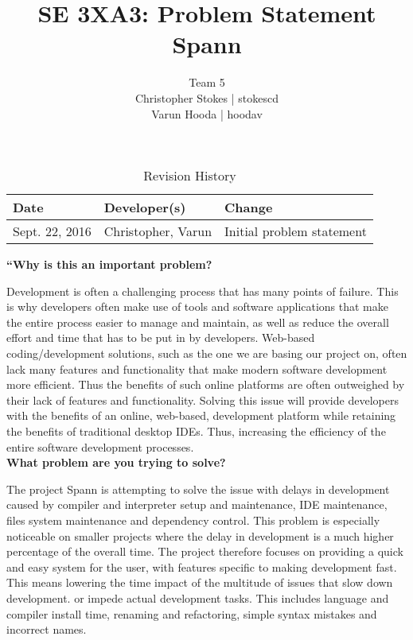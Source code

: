 \documentclass{article}
\title{SE 3XA3: Problem Statement\\Spann}
\author{Team 5
		\\ Christopher Stokes | stokescd
		\\ Varun Hooda | hoodav
}
\date{}
\begin{document}
\begin{table}[hp]
\caption{Revision History} \label{TblRevisionHistory}
\begin{tabularx}{\textwidth}{llX}
\toprule
\textbf{Date} & \textbf{Developer(s)} & \textbf{Change}\\
\midrule
    Sept. 22, 2016 & Christopher, Varun & Initial problem statement\\
\bottomrule
\end{tabularx}
\end{table}

\newpage

\maketitle

\large
\textbf{“Why is this an important problem?}\\
\normalsize

Development is often a challenging process that has many points of failure.
This is why developers often make use of tools and software applications that
make the entire process easier to manage and maintain, as well as reduce the
overall effort and time that has to be put in by developers. Web-based
coding/development solutions, such as the one we are basing our project on,
often lack many features and functionality that make modern software
development more efficient. Thus the benefits of such online platforms are
often outweighed by their lack of features and functionality. Solving this
issue will provide developers with the benefits of an online, web-based,
development platform while retaining the benefits of traditional desktop IDEs.
Thus, increasing the efficiency of the entire software development processes.\\

\large
\textbf{What problem are you trying to solve?}\\
\normalsize

The project Spann is attempting to solve the issue with delays in development
caused by compiler and interpreter setup and maintenance,  IDE maintenance,
files system maintenance and dependency control. This problem is especially
noticeable on smaller projects where the delay in development is a much higher
percentage of the overall time. The project therefore focuses on providing a
quick and easy system for the user, with features specific to making
development fast. This means lowering the time impact of the multitude of
issues that slow down development. or impede actual development tasks. This
includes language and compiler install time, renaming and refactoring, simple
syntax mistakes and incorrect names.\\
\end{document}
